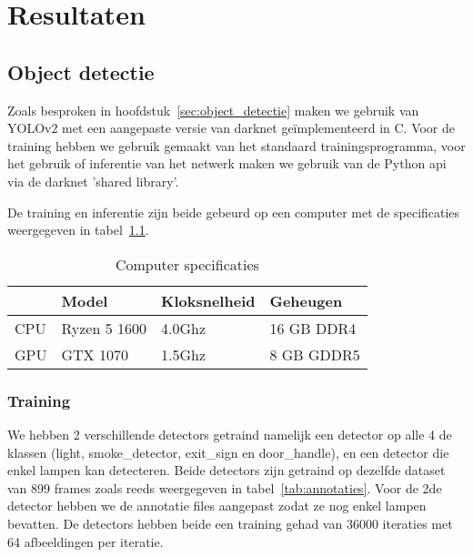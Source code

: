  
\chapter{Resultaten}\label{ch:resultaten}

\section{Object detectie}

Zoals besproken in hoofdstuk~\ref{sec:object_detectie} maken we gebruik van YOLOv2 met een aangepaste versie van darknet ge\"{i}mplementeerd in C.
Voor de training hebben we gebruik gemaakt van het standaard trainingsprogramma, voor het gebruik of inferentie van het netwerk maken we gebruik van
de Python api via de darknet 'shared library'.

De training en inferentie zijn beide gebeurd op een computer met de specificaties weergegeven in tabel~\ref{tab:specs}.

\begin{table}[!h]
    \caption{Computer specificaties}
    \label{tab:specs}
    \centering
    \begin{tabular}{l|l|l|l}
        & Model & Kloksnelheid & Geheugen \\
        \hline
        CPU & Ryzen 5 1600 & 4.0Ghz & 16 GB DDR4 \\
        GPU & GTX 1070 & 1.5Ghz & 8 GB GDDR5
    \end{tabular}
\end{table}

\subsection{Training}

We hebben 2 verschillende detectors getraind namelijk een detector op alle 4 de klassen (light, smoke\_detector, exit\_sign en door\_handle), en een detector
die enkel lampen kan detecteren.
Beide detectors zijn getraind op dezelfde dataset van 899 frames zoals reeds weergegeven in tabel~\ref{tab:annotaties}.
Voor de 2de detector hebben we de annotatie files aangepast zodat ze nog enkel lampen bevatten.
De detectors hebben beide een training gehad van 36000 iteraties met 64 afbeeldingen per iteratie.


